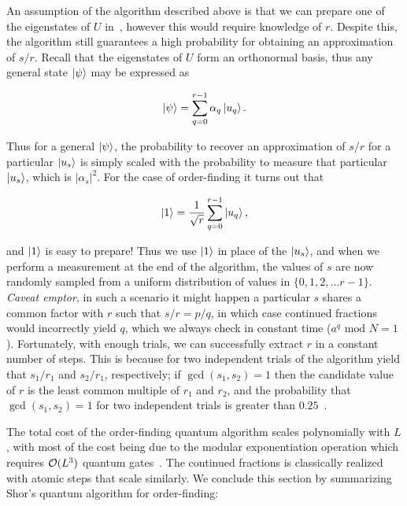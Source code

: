 \bigskip
\noindent
An assumption of the algorithm described above is that we can prepare one of the eigenstates of $U$ in~, however this would require knowledge of $r$. Despite this, the algorithm still guarantees a high probability for obtaining an approximation of $s/r$. Recall that the eigenstates of $U$ form an orthonormal basis, thus any general state $\ket{\psi}$ may be expressed as

\begin{align}
	\ket{\psi} = \displaystyle\sum_{q=0}^{r-1} \alpha_q \ket{u_q}.
\end{align}

\noindent
Thus for a general $\ket{\psi}$, the probability to recover an approximation of $s/r$ for a particular $\ket{u_s}$ is simply scaled with the probability to measure that particular $\ket{u_s}$, which is $|\alpha_s|^2$. For the case of order-finding it turns out that 

\begin{align}
	\ket{1} = \frac{1}{\sqrt{r}} \displaystyle\sum_{q=0}^{r-1}\ket{u_q},
\end{align}

\noindent
and $\ket{1}$ is easy to prepare! Thus we use $\ket{1}$ in place of the $\ket{u_s}$, and when we perform a measurement at the end of the algorithm, the values of $s$ are now randomly sampled from a uniform distribution of values in $\{0, 1, 2, \ldots r-1\}$. \emph{Caveat emptor}, in such a scenario it might happen a particular $s$ shares a common factor with $r$ such that $s/r = p/q$, in which case continued fractions would incorrectly yield $q$, which we always check in constant time ($a^q \text{ mod }N = 1$). Fortunately, with enough trials, we can successfully extract $r$ in a constant number of steps. This is because for two independent trials of the algorithm yield that $s_1/r_1$ and $s_2/r_1$, respectively; if $\gcd(s_1, s_2)=1$ then the candidate value of $r$ is the least common multiple of $r_1$ and $r_2$, and the probability that $\gcd(s_1, s_2) = 1$ for two independent trials is greater than $0.25$~\cite{Mike&Ike}.


\bigskip
\noindent
The total cost of the order-finding quantum algorithm scales polynomially with $L$, with most of the cost being due to the modular exponentiation operation which requires $\mathcal{O}(L^3)$ quantum gates~\cite{Mike&Ike}. The continued fractions is classically realized with atomic steps that scale similarly. We conclude this section by summarizing Shor's quantum algorithm for order-finding:

